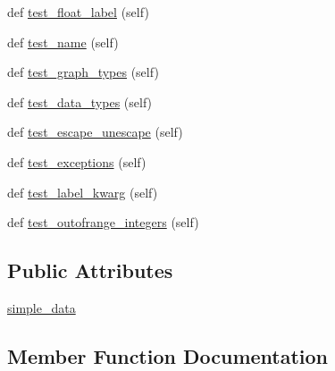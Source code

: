 \begin{DoxyCompactItemize}
\item 
def \hyperlink{classnetworkx_1_1readwrite_1_1tests_1_1test__gml_1_1TestGraph_a52b0d1ac550f46dc8c39dcf9227b7d53}{test\+\_\+float\+\_\+label} (self)
\item 
def \hyperlink{classnetworkx_1_1readwrite_1_1tests_1_1test__gml_1_1TestGraph_a1ac03c2fdfba43e17f214b5171e3ef46}{test\+\_\+name} (self)
\item 
def \hyperlink{classnetworkx_1_1readwrite_1_1tests_1_1test__gml_1_1TestGraph_a504e73268819d27127bb25847db6c507}{test\+\_\+graph\+\_\+types} (self)
\item 
def \hyperlink{classnetworkx_1_1readwrite_1_1tests_1_1test__gml_1_1TestGraph_a76c621f88f1f7def980b90246b128cea}{test\+\_\+data\+\_\+types} (self)
\item 
def \hyperlink{classnetworkx_1_1readwrite_1_1tests_1_1test__gml_1_1TestGraph_ab89a97c9be5bc594e2a7649fcd47859c}{test\+\_\+escape\+\_\+unescape} (self)
\item 
def \hyperlink{classnetworkx_1_1readwrite_1_1tests_1_1test__gml_1_1TestGraph_a358b022e242c875ec8c8d1dde5f3e3ef}{test\+\_\+exceptions} (self)
\item 
def \hyperlink{classnetworkx_1_1readwrite_1_1tests_1_1test__gml_1_1TestGraph_aa01ec58d26f10400cdb2a5c21ca4bf9b}{test\+\_\+label\+\_\+kwarg} (self)
\item 
def \hyperlink{classnetworkx_1_1readwrite_1_1tests_1_1test__gml_1_1TestGraph_addd816a2690e49f572f6c3fb6b1b0872}{test\+\_\+outofrange\+\_\+integers} (self)
\end{DoxyCompactItemize}
\subsection*{Public Attributes}
\begin{DoxyCompactItemize}
\item 
\hyperlink{classnetworkx_1_1readwrite_1_1tests_1_1test__gml_1_1TestGraph_a9afb0d5ac06f225537adfbcc4e556a19}{simple\+\_\+data}
\end{DoxyCompactItemize}


\subsection{Member Function Documentation}
\mbox{\label{classnetworkx_1_1readwrite_1_1tests_1_1test__gml_1_1TestGraph_ad4adf1f43630550390d691f5f97193db}} 
